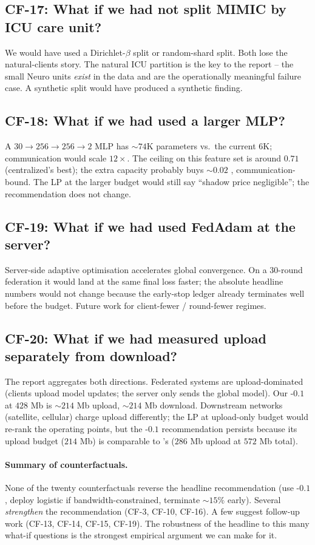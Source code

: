 \subsection{CF-17: What if we had not split MIMIC by ICU care unit?}
We would have used a Dirichlet-$\beta$ split or random-shard split.
Both lose the natural-clients story. The natural ICU partition is the
key to the report -- the small Neuro units \emph{exist} in the data
and are the operationally meaningful failure case. A synthetic split
would have produced a synthetic finding.

\subsection{CF-18: What if we had used a larger MLP?}
A $30 \!\to\! 256 \!\to\! 256 \!\to\! 2$ MLP has $\sim$$74$K
parameters vs.\ the current $6$K; communication would scale
$12\!\times$. The \auprc{} ceiling on this feature set is around
$0.71$ (centralized's best); the extra capacity probably buys
$\sim$$0.02$ \auprc{}, communication-bound. The LP at the larger
budget would still say ``shadow price negligible''; the
recommendation does not change.

\subsection{CF-19: What if we had used FedAdam at the server?}
Server-side adaptive optimisation accelerates global convergence.
On a $30$-round federation it would land at the same final loss
faster; the absolute headline numbers would not change because the
early-stop ledger already terminates well before the budget. Future
work for client-fewer / round-fewer regimes.

\subsection{CF-20: What if we had measured upload separately from
download?}
The report aggregates both directions. Federated systems are
upload-dominated (clients upload model updates; the server only
sends the global model). Our \fedprox{}-$0.1$ at $428$ Mb is
$\sim$$214$ Mb upload, $\sim$$214$ Mb download. Downstream networks
(satellite, cellular) charge upload differently; the LP at
upload-only budget would re-rank the operating points, but the
\fedprox{}-$0.1$ recommendation persists because its upload
budget ($214$ Mb) is comparable to \fedavg{}'s ($286$ Mb upload at
$572$ Mb total).

\paragraph{Summary of counterfactuals.}
None of the twenty counterfactuals reverse the headline
recommendation (use \fedprox{}-$0.1$, deploy logistic if
bandwidth-constrained, terminate $\sim$$15\%$ early). Several
\emph{strengthen} the recommendation (CF-3, CF-10, CF-16). A few
suggest follow-up work (CF-13, CF-14, CF-15, CF-19). The robustness
of the headline to this many what-if questions is the strongest
empirical argument we can make for it.
